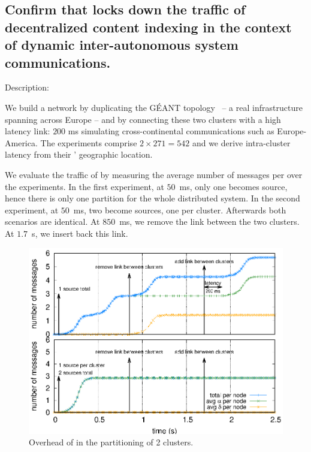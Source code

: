\subsection{Confirm that \NAME locks down the traffic of decentralized content
  indexing in the context of dynamic inter-autonomous system
  communications.}

\begin{asparadesc}
\item [Description:]

We build a network by duplicating the G{\'E}ANT
topology~\cite{knight2011internet} -- a real infrastructure spanning
across Europe -- and by connecting these two clusters with a high
latency link: $200$ ms simulating cross-continental communications
such as Europe-America. The experiments comprise $2 \times 271 = 542$
\processes and we derive intra-cluster latency from their \processes'
geographic location.

\noindent We evaluate the traffic of \NAME by measuring the average
number of messages per \process over the experiments. In the first
experiment, at $50$~ms, only one \process becomes source, hence there
is only one partition for the whole distributed system. In the second
experiment, at $50$~ms, two \processes become sources, one per
cluster. Afterwards both scenarios are identical. At $850$~ms, we
remove the link between the two clusters. At $1.7$~s, we insert back this
link.

\begin{figure}
  \centering\includegraphics[width=0.99\columnwidth]{img/as_cast_geant.eps}
  \caption{\label{fig:geant}Overhead of \NAME in the partitioning of 2 clusters.}
\end{figure}


\end{asparadesc}
